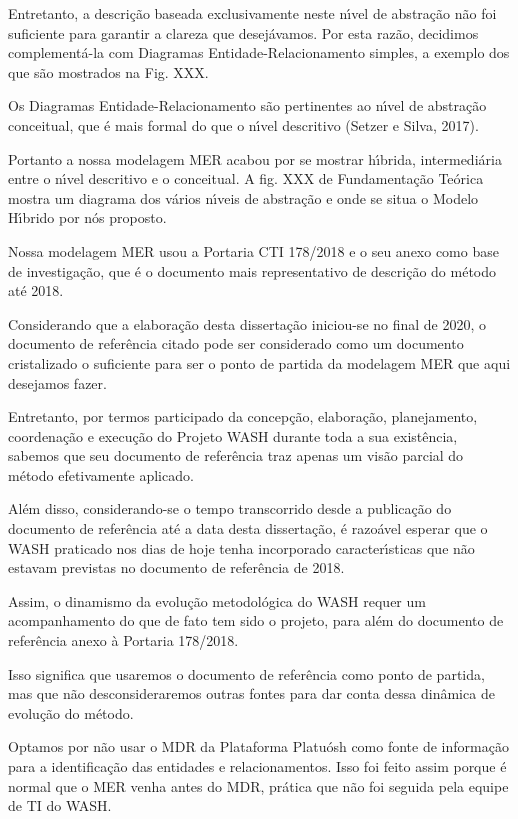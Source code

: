 \documentclass[
12pt,		%
openright,	%
twoside,  %
a4paper,			%
chapter=TITLE,		%
english,			%
french,				%
spanish,			%
brazil				%
]{USPSC-classe/USPSC}
\begin{document}
Entretanto, a descri\c{c}\~ao baseada exclusivamente neste n\'{\i}vel de abstra\c{c}\~ao n\~ao foi suficiente para garantir a clareza que desej\'avamos. Por esta raz\~ao, decidimos complement\'a-la com Diagramas Entidade-Relacionamento simples, a exemplo dos que s\~ao mostrados na Fig. XXX.


Os Diagramas Entidade-Relacionamento s\~ao pertinentes ao n\'{\i}vel de abstra\c{c}\~ao conceitual, que \'e mais formal do que o n\'{\i}vel descritivo (Setzer e Silva, 2017).


Portanto a nossa modelagem MER acabou por se mostrar h\'{\i}brida, intermedi\'aria entre o n\'{\i}vel descritivo e o conceitual. A fig. XXX de Fundamenta\c{c}\~ao Te\'orica mostra um diagrama dos v\'arios n\'{\i}veis de abstra\c{c}\~ao e onde se situa o Modelo H\'{\i}brido por n\'os proposto.


Nossa modelagem MER usou a Portaria CTI 178/2018 e o seu anexo como base de investiga\c{c}\~ao, que \'e o documento mais representativo de descri\c{c}\~ao do m\'etodo at\'e 2018.


Considerando que a elabora\c{c}\~ao desta disserta\c{c}\~ao iniciou-se no final de 2020, o documento de refer\^encia citado pode ser considerado como um documento cristalizado o suficiente para ser o ponto de partida da modelagem MER que aqui desejamos fazer.


Entretanto, por termos participado da concep\c{c}\~ao, elabora\c{c}\~ao, planejamento, coordena\c{c}\~ao e execu\c{c}\~ao do Projeto WASH durante toda a sua exist\^encia, sabemos que seu documento de refer\^encia traz apenas um vis\~ao parcial do m\'etodo efetivamente aplicado.


Al\'em disso, considerando-se o tempo transcorrido desde a publica\c{c}\~ao do documento de refer\^encia at\'e a data desta disserta\c{c}\~ao, \'e razo\'avel esperar que o WASH praticado nos dias de hoje tenha incorporado caracter\'{\i}sticas que n\~ao estavam previstas no documento de refer\^encia de 2018.


Assim, o dinamismo da evolu\c{c}\~ao metodol\'ogica do WASH requer um acompanhamento do que de fato tem sido o projeto, para al\'em do documento de refer\^encia anexo \`a Portaria 178/2018.


Isso significa que usaremos o documento de refer\^encia como ponto de partida, mas que n\~ao desconsideraremos outras fontes para dar conta dessa din\^amica de evolu\c{c}\~ao do m\'etodo.


Optamos por n\~ao usar o MDR da Plataforma Platu\'osh como fonte de informa\c{c}\~ao para a identifica\c{c}\~ao das entidades e relacionamentos. Isso foi feito assim porque \'e normal que o MER venha antes do MDR, pr\'atica que n\~ao foi seguida pela equipe de TI do WASH.
\end{document}
